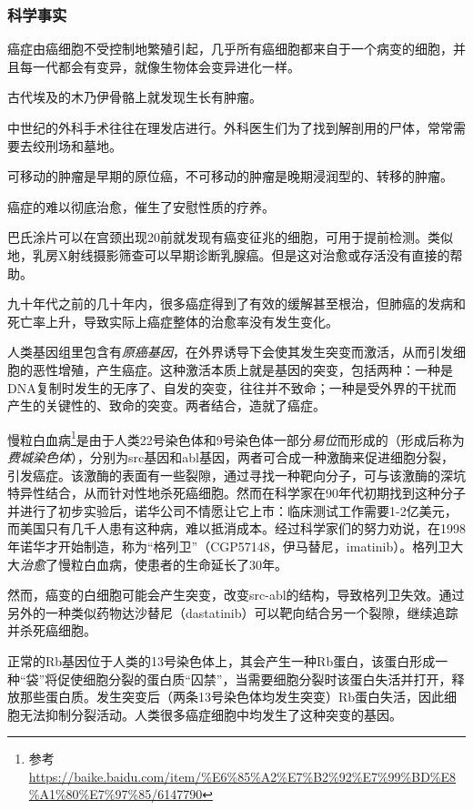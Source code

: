 \subsubsection{科学事实}
\begin{itemize*}
	\item 癌症由癌细胞不受控制地繁殖引起，几乎所有癌细胞都来自于一个病变的细胞，并且每一代都会有变异，就像生物体会变异进化一样。
	\item 古代埃及的木乃伊骨骼上就发现生长有肿瘤。
	\item 中世纪的外科手术往往在理发店进行。外科医生们为了找到解剖用的尸体，常常需要去绞刑场和墓地。
	\item 可移动的肿瘤是早期的原位癌，不可移动的肿瘤是晚期浸润型的、转移的肿瘤。
	\item 癌症的难以彻底治愈，催生了安慰性质的疗养。
	\item 巴氏涂片可以在宫颈出现20前就发现有癌变征兆的细胞，可用于提前检测。类似地，乳房X射线摄影筛查可以早期诊断乳腺癌。但是这对治愈或存活没有直接的帮助。
	\item 九十年代之前的几十年内，很多癌症得到了有效的缓解甚至根治，但肺癌的发病和死亡率上升，导致实际上癌症整体的治愈率没有发生变化。
	\item 人类基因组里包含有\emph{原癌基因}，在外界诱导下会使其发生突变而激活，从而引发细胞的恶性增殖，产生癌症。这种激活本质上就是基因的突变，包括两种：一种是DNA复制时发生的无序了、自发的突变，往往并不致命；一种是受外界的干扰而产生的关键性的、致命的突变。两者结合，造就了癌症。
	\item 慢粒白血病\footnote{参考\url{https://baike.baidu.com/item/\%E6\%85\%A2\%E7\%B2\%92\%E7\%99\%BD\%E8\%A1\%80\%E7\%97\%85/6147790}}是由于人类22号染色体和9号染色体一部分\emph{易位}而形成的（形成后称为\emph{费城染色体}），分别为src基因和abl基因，两者可合成一种激酶来促进细胞分裂，引发癌症。该激酶的表面有一些裂隙，通过寻找一种靶向分子，可与该激酶的深坑特异性结合，从而针对性地杀死癌细胞。然而在科学家在90年代初期找到这种分子并进行了初步实验后，诺华公司不情愿让它上市：临床测试工作需要1-2亿美元，而美国只有几千人患有这种病，难以抵消成本。经过科学家们的努力劝说，在1998年诺华才开始制造，称为“格列卫”（CGP57148，伊马替尼，imatinib）。格列卫大大\emph{治愈}了慢粒白血病，使患者的生命延长了30年。
	\item 然而，癌变的白细胞可能会产生突变，改变src-abl的结构，导致格列卫失效。通过另外的一种类似药物达沙替尼（dastatinib）可以靶向结合另一个裂隙，继续追踪并杀死癌细胞。
	\item 正常的Rb基因位于人类的13号染色体上，其会产生一种Rb蛋白，该蛋白形成一种“袋”将促使细胞分裂的蛋白质“囚禁”，当需要细胞分裂时该蛋白失活并打开，释放那些蛋白质。发生突变后（两条13号染色体均发生突变）Rb蛋白失活，因此细胞无法抑制分裂活动。人类很多癌症细胞中均发生了这种突变的基因。

\end{itemize*}

